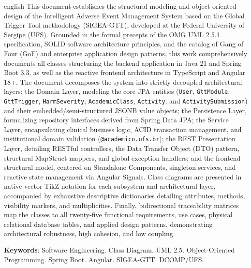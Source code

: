 \begin{resumo}[Abstract]
\begin{otherlanguage*}{english}
This document establishes the structural modeling and object-oriented design of the Intelligent Adverse Event Management System based on the Global Trigger Tool methodology (SIGEA-GTT), developed at the Federal University of Sergipe (UFS). Grounded in the formal precepts of the OMG UML 2.5.1 specification, SOLID software architecture principles, and the catalog of Gang of Four (GoF) and enterprise application design patterns, this work comprehensively documents all classes structuring the backend application in Java 21 and Spring Boot 3.3, as well as the reactive frontend architecture in TypeScript and Angular 18+. The document decomposes the system into strictly decoupled architectural layers: the Domain Layer, modeling the core JPA entities (\texttt{User}, \texttt{GttModule}, \texttt{GttTrigger}, \texttt{HarmSeverity}, \texttt{AcademicClass}, \texttt{Activity}, and \texttt{ActivitySubmission}) and their embedded/semi-structured JSONB value objects; the Persistence Layer, formalizing repository interfaces derived from Spring Data JPA; the Service Layer, encapsulating clinical business logic, ACID transaction management, and institutional domain validation (\texttt{@academico.ufs.br}); the REST Presentation Layer, detailing RESTful controllers, the Data Transfer Object (DTO) pattern, structural MapStruct mappers, and global exception handlers; and the frontend structural model, centered on Standalone Components, singleton services, and reactive state management via Angular Signals. Class diagrams are presented in native vector TikZ notation for each subsystem and architectural layer, accompanied by exhaustive descriptive dictionaries detailing attributes, methods, visibility markers, and multiplicities. Finally, bidirectional traceability matrices map the classes to all twenty-five functional requirements, use cases, physical relational database tables, and applied design patterns, demonstrating architectural robustness, high cohesion, and low coupling.

\vspace{\onelineskip}
\noindent
\textbf{Keywords}: Software Engineering. Class Diagram. UML 2.5. Object-Oriented Programming. Spring Boot. Angular. SIGEA-GTT. DCOMP/UFS.
\end{otherlanguage*}
\end{resumo}
